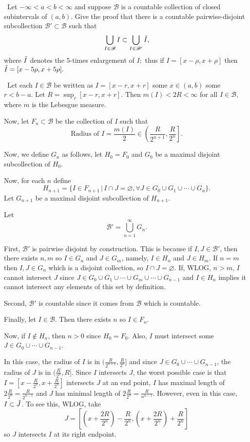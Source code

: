 \documentclass[12pt]{Homework}
\begin{document}
\begin{problem} $\,$
Let $-\infty<a<b<\infty$ and suppose $\mathscr{B}$ is a countable collection of closed subintervals of $(a,b).$ Give the proof that there is a countable pairwise-disjoint subcollection $\mathscr{B}'\subset\mathscr{B}$ such that $$\bigcup_{I\in\mathscr{B}}I\subset\bigcup_{I\in\mathscr{B}'}\Tilde{I},$$ where $\Tilde{I}$ denotes the $5$-times enlargement of $I;$ thus if $I=[x-\rho,x+\rho]$ then $\Tilde{I}=[x-5\rho,x+5\rho].$
\end{problem}


\begin{solution}$\,$
Let each $I\in\mathscr{B}$ be written as $I=[x-r,x+r]$ some $x\in (a,b)$ some $r<b-a$. Let $R=\sup_r[x-r,x+r]$. Then $m(I)<2R<\infty$ for all $I\in\mathscr{B}$, where $m$ is the Lebesgue measure.

Now, let $F_n\subset\mathscr{B}$ be the collection of $I$ such that $$\text{Radius of }I=\frac{m(I)}{2}\in\left(\frac{R}{2^{n+1}},\frac{R}{2^n}\right].$$

Now, we define $G_n$ as follows, let $H_0=F_0$ and $G_0$ be a maximal disjoint subcollection of $H_0$.

Now, for each $n$ define $$H_{n+1}=\{I\in F_{n+1}\,|\,I\cap J=\varnothing,\forall J\in G_0\cup G_1\cup\cdots\cup G_n\}.$$ Let $G_{n+1}$ be a maximal disjoint subcollection of $H_{n+1}.$

Let $$\mathscr{B}'=\bigcup_{n=1}^\infty G_n.$$

First, $\mathscr{B}'$ is pairwise disjoint by construction. This is because if $I,J\in\mathscr{B}'$, then there exists $n,m$ so $I\in G_n$ and $J\in G_m$, namely, $I\in H_n$ and $J\in H_m$. If $n=m$ then $I,J\in G_n$ which is a disjoint collection, so $I\cap J=\varnothing.$ If, WLOG, $n>m$, $I$ cannot intersect $J$ since $J\in G_0\cup G_1\cup\cdots\cup G_m\cup\cdots\cup G_{n-1}$ and $I\in H_n$ implies it cannot intersect any elements of this set by definition.

Second, $\mathscr{B}'$ is countable since it comes from $\mathscr{B}$ which is countable.

Finally, let $I\in\mathscr{B}$. Then there exists $n$ so $I\in F_n$. 

Now, if $I\notin H_n$, then $n>0$ since $H_0=F_0$. Also, $I$ must intersect some $J\in G_0\cup\cdots\cup G_{n-1}$. 

In this case, the radius of $I$ is in $(\frac{R}{2^{n+1}},\frac{R}{2^n}]$ and since $J\in G_0\cup\cdots\cup G_{n-1}$, the radius of $J$ is in $(\frac{R}{2^n},R]$. Since $I$ intersects $J$, the worst possible case is that $I=[x-\frac{R}{2^n},x+\frac{R}{2^n}]$ intersects $J$ at an end point, $I$ has maximal length of $2\frac{R}{2^n}=\frac{R}{2^{n-1}}$ and $J$ has minimal length of $2\frac{R}{2^n}=\frac{R}{n^{n-1}}$. However, even in this case, $I\subset \Tilde{J}$. To see this, WLOG, take $$J=\left[\left(x+\frac{2R}{2^n}\right)-\frac{R}{2^n},\left(x+\frac{2R}{2^n}\right)+\frac{R}{2^n}\right]$$ so $J$ intersects $I$ at its right endpoint.


\end{solution}
\end{document}
